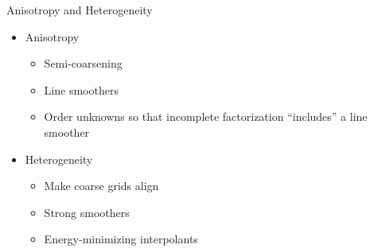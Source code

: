\begin{frame}{Anisotropy and Heterogeneity}
  \begin{itemize}
  \item Anisotropy
    \begin{itemize}
    \item Semi-coarsening
    \item Line smoothers
    \item Order unknowns so that incomplete factorization ``includes'' a
      line smoother
    \end{itemize}
  \item Heterogeneity
    \begin{itemize}
    \item Make coarse grids align
    \item Strong smoothers
    \item Energy-minimizing interpolants
    \end{itemize}
  \end{itemize}
\end{frame}
